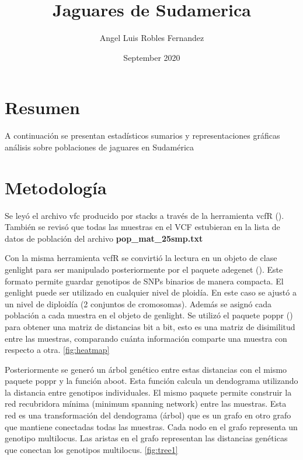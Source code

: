 \documentclass{article}
\title{Jaguares de Sudamerica}
\author{Angel Luis Robles Fernandez}
\date{September 2020}
\begin{document}
\maketitle

\section{Resumen}
A continuación se presentan estadísticos sumarios y representaciones gráficas análisis sobre poblaciones de jaguares en Sudamérica



\section{Metodología}

Se leyó el archivo vfc producido por stacks a través de la herramienta vcfR
(\citealt{knaus2017}). También se revisó que todas las muestras en el VCF estubieran en la lista de datos de población del archivo \textbf{pop\_mat\_25smp.txt}

Con la misma herramienta vcfR se convirtió la lectura en un objeto de clase genlight para ser manipulado posteriormente por el paquete adegenet (\citealt{jombart2011}). Este formato permite guardar genotipos de SNPs binarios de manera compacta. El genlight puede ser utilizado en cualquier nivel de ploidía. En este caso se ajustó a un nivel de diploidía (2 conjuntos de cromosomas). Además se asignó cada población a cada muestra en el objeto de genlight. 
Se utilizó el paquete poppr (\citealt{kamvar2015novel}) para obtener una matriz de distancias bit a bit, esto es una matriz de disimilitud entre las muestras, comparando cuánta información comparte una muestra con respecto a otra. \ref{fig:heatmap}

Posteriormente se generó un árbol genético entre estas distancias con el mismo paquete poppr y la función aboot. Esta función calcula un dendograma utilizando la distancia entre genotipos individuales. El mismo paquete permite construir la red recubridora mínima (minimum spanning network) entre las muestras. Esta red es una transformación del dendograma (árbol) que es un grafo en otro grafo que mantiene conectadas todas las muestras. Cada nodo en el grafo representa un genotipo multilocus. Las aristas en el grafo representan las  distancias genéticas que conectan los genotipos multilocus. \ref{fig:tree1} 
\end{document}
